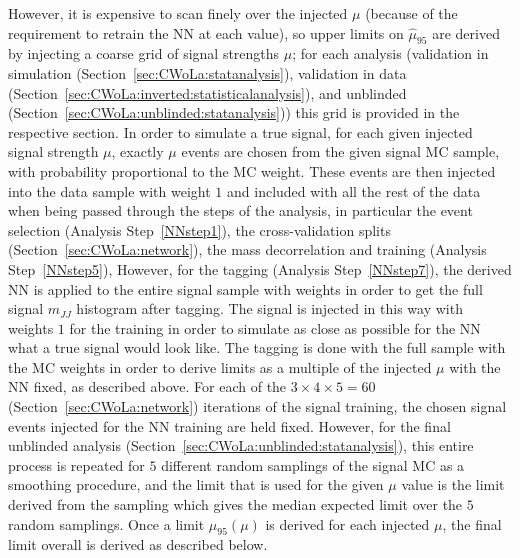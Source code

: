 However, it is expensive to scan finely over the injected $\mu$ (because of the requirement to retrain the NN at each value), so upper limits on $\hat{\mu}_{95}$ are derived by injecting a coarse grid of signal strengths $\mu$; for each analysis (validation in simulation (Section~\ref{sec:CWoLa:statanalysis}), validation in data (Section~\ref{sec:CWoLa:inverted:statisticalanalysis}), and unblinded (Section~\ref{sec:CWoLa:unblinded:statanalysis})) this grid is provided in the respective section.
In order to simulate a true signal, for each given injected signal strength $\mu$, exactly $\mu$ events are chosen from the given signal MC sample, with probability proportional to the MC weight.
These events are then injected into the data sample with weight $1$ and included with all the rest of the data when being passed through the steps of the analysis, in particular the event selection (Analysis Step~\ref{NNstep1}), the cross-validation splits (Section~\ref{sec:CWoLa:network}), the mass decorrelation and training (Analysis Step~\ref{NNstep5}),
However, for the tagging (Analysis Step~\ref{NNstep7}), the derived NN is applied to the entire signal sample with weights in order to get the full signal $m_{JJ}$ histogram after tagging.
The signal is injected in this way with weights $1$ for the training in order to simulate as close as possible for the NN what a true signal would look like.
The tagging is done with the full sample with the MC weights in order to derive limits as a multiple of the injected $\mu$ with the NN fixed, as described above.
For each of the $3\times4\times5=60$ (Section~\ref{sec:CWoLa:network}) iterations of the signal training, the chosen signal events injected for the NN training are held fixed.
However, for the final unblinded analysis (Section~\ref{sec:CWoLa:unblinded:statanalysis}), this entire process is repeated for $5$ different random samplings of the signal MC as a smoothing procedure, and the limit that is used for the given $\mu$ value is the limit derived from the sampling which gives the median expected limit over the $5$ random samplings.
Once a limit $\mu_{95}(\mu)$ is derived for each injected $\mu$, the final limit overall is derived as described below.

